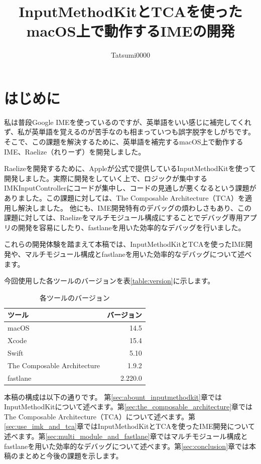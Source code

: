 \documentclass[uplatex,a4j,12pt,twocolumn]{jsarticle}
\begin{document}
\title{InputMethodKitとTCAを使ったmacOS上で動作するIMEの開発}
\author{Tatsumi0000}
\date{}
\maketitle

\section{はじめに}\label{sec:intro}
私は普段Google IMEを使っているのですが、英単語をいい感じに補完してくれず、私が英単語を覚えるのが苦手なのも相まっていつも誤字脱字をしがちです。そこで、この課題を解決するために、英単語を補完するmacOS上で動作するIME、Raelize（れりーず）を開発しました。

Raelizeを開発するために、Appleが公式で提供しているInputMethodKit\cite{bib:about_inputmethodkit}を使って開発しました。実際に開発をしていく上で、ロジックが集中するIMKInputControllerにコードが集中し、コードの見通しが悪くなるという課題がありました。この課題に対しては、The Composable Architecture（TCA）\cite{bib:the_composable_architecture}を適用し解決しました。
他にも、IME開発特有のデバッグの煩わしさもあり、この課題に対しては、Raelizeをマルチモジュール構成にすることでデバッグ専用アプリの開発を容易にしたり、fastlane\cite{bib:fastlane}を用いた効率的なデバッグを行いました。

これらの開発体験を踏まえて本稿では、InputMethodKitとTCAを使ったIME開発や、マルチモジュール構成とfastlaneを用いた効率的なデバッグについて述べます。

今回使用した各ツールのバージョンを表\ref{table:version}に示します。
\begin{table}[h]
  \begin{center}
    \caption{各ツールのバージョン}
    \begin{tabular}{|l|r|} \hline
      ツール & バージョン \\ \hline
      macOS & 14.5 \\
      Xcode & 15.4 \\
      Swift & 5.10 \\
      The Composable Architecture & 1.9.2 \\
      fastlane & 2.220.0 \\ \hline
    \end{tabular}
  \end{center}
\end{table}\label{table:version}

本稿の構成は以下の通りです。
第\ref{sec:abount_inputmethodkit}章ではInputMethodKitについて述べます。第\ref{sec:the_composable_architecture}章ではThe Composable Architecture（TCA）について述べます。第\ref{sec:use_imk_and_tca}章ではInputMethodKitとTCAを使ったIME開発について述べます。第\ref{sec:multi_module_and_fastlane}章ではマルチモジュール構成とfastlaneを用いた効率的なデバッグについて述べます。第\ref{sec:conclusion}章では本稿のまとめと今後の課題を示します。
\end{document}

